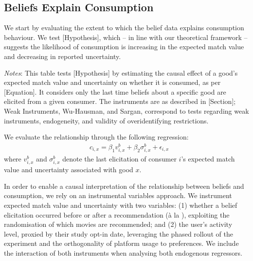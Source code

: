 \documentclass[12pt]{article}
\theoremstyle{newtheorem}
\begin{document}
\subsection{Beliefs Explain Consumption}
\label{section:mechanisms:consumption-on-beliefs}

We start by evaluating the extent to which the belief data explains consumption behaviour. 
We test [Hypothesis], which -- in line with our theoretical framework -- suggests the likelihood of consumption is increasing in the expected match value and decreasing in reported uncertainty.

\begin{table}[th!]
	\centering
	
    \begin{minipage}{1\textwidth}
        \vspace*{.5em}
        \caption{Beliefs Explain Consumption ([Hypothesis])}
        \label{table:iv-consumption-on-beliefs}
         \emph{Notes}: 
        This table tests [Hypothesis] by estimating the causal effect of a good's expected match value and uncertainty on whether it is consumed, as per [Equation]. 
        It considers only the last time beliefs about a specific good are elicited from a given consumer. 
        The instruments are as described in [Section]; Weak Instruments, Wu-Hausman, and Sargan, correspond to tests regarding weak instruments, endogeneity, and validity of overidentifying restrictions.
    \end{minipage}
\end{table}

We evaluate the relationship through the following regression:
\begin{align}
    \label{equation:beliefs-on-consumption}
    &
    c_{i,x} = \beta_1 v_{i,x}^b + \beta_2 \sigma_{i,x}^b + \epsilon_{i,x}
\end{align}
\noindent
where $v_{i,x}^b$ and $\sigma_{i,x}^b$ denote the last elicitation of consumer $i$'s expected match value and uncertainty associated with good $x$.


In order to enable a causal interpretation of the relationship between beliefs and consumption, we rely on an instrumental variables approach. 
We instrument expected match value and uncertainty with two variables: 
(1) whether a belief elicitation occurred before or after a recommendation (\`{a} la \citet{HaalandRothWohlfart2023JEL}), exploiting the randomisation of which movies are recommended; and 
(2) the user's activity level, proxied by their study opt-in date, leveraging the phased rollout of the experiment and the orthogonality of platform usage to preferences. 
We include the interaction of both instruments when analysing both endogenous regressors.
\end{document}
